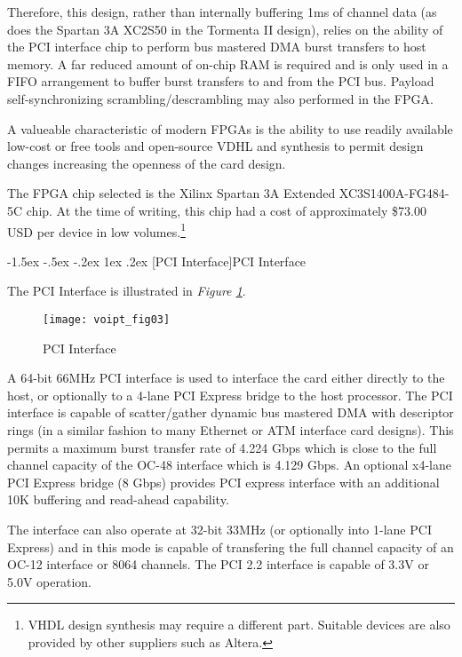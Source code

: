 \documentclass[letterpaper,final,notitlepage,twocolumn,10pt,twoside]{article}
\makeatletter
\renewcommand\subsection{\@startsection{subsection}{2}{\z@}%
                                     {-1.5ex \@plus -.5ex \@minus -.2ex}%
                                     {1ex \@plus .2ex}%
                                     {\normalfont\normalsize\bfseries}}
\makeatother
\begin{document}
Therefore, this design, rather than internally buffering 1ms of channel data (as
does the Spartan 3A XC2S50 in the Tormenta II design), relies on the ability of
the PCI interface chip to perform bus mastered DMA burst transfers to host
memory.  A far reduced amount of on-chip RAM is required and is only used in a
FIFO arrangement to buffer burst transfers to and from the PCI bus.  Payload
self-synchronizing scrambling/descrambling may also performed in the FPGA.

A valueable characteristic of modern FPGAs is the ability to use readily
available low-cost or free tools and open-source VDHL and synthesis to permit
design changes increasing the openness of the card design.

The FPGA chip selected is the Xilinx Spartan 3A Extended XC3S1400A-FG484-5C
chip.  At the time of writing, this chip had a cost of approximately \$73.00 USD
per device in low volumes.\footnote{VHDL design synthesis may require a
different part.  Suitable devices are also provided by other suppliers such as
Altera.}

\subsection[PCI Interface]{PCI Interface}

The PCI Interface is illustrated in \textsl{Figure \ref{figure:voipt_fig03}}.
\begin{figure}[htp]
\center\texttt{[image: voipt\_fig03]}
\caption[PCI Interface]{PCI Interface}
\label{figure:voipt_fig03}
\end{figure}
A 64-bit 66MHz PCI interface is used to interface the card either directly to
the host, or optionally to a 4-lane PCI Express bridge to the host processor.
The PCI interface is capable of scatter/gather dynamic bus mastered DMA with
descriptor rings (in a similar fashion to many Ethernet or ATM interface card
designs).  This permits a maximum burst transfer rate of 4.224 Gbps which is
close to the full channel capacity of the OC-48 interface which is 4.129 Gbps.
An optional x4-lane PCI Express bridge (8 Gbps) provides PCI express interface
with an additional 10K buffering and read-ahead capability.

The interface can also operate at 32-bit 33MHz (or optionally into 1-lane PCI
Express) and in this mode is capable of transfering the full channel capacity of
an OC-12 interface or 8064 channels.  The PCI 2.2 interface is capable of 3.3V
or 5.0V operation.
\end{document}
